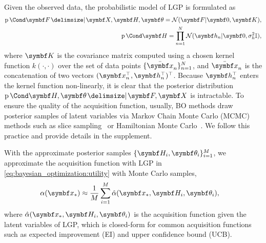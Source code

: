 Given the observed data, the probabilistic model of LGP is formulated as
\begin{align}
    \begin{split}
        \Prob{\mat{F} \given \mat{X}, \mat{H}, \mat{\theta}} = \mathcal{N}(\mat{F} | \mat{0}, \mat{K}),\\
        \Prob{\mat{H}} = \prod_{n=1}^N \mathcal{N}(\mat{h}_n | \mat{0}, \sigma_h^2\mathbb{I}),
    \end{split}
\end{align}
where $\mat{K}$ is the covariance matrix computed using a chosen kernel function $k(\cdot, \cdot)$ over the set of data points $\{\bar{\mat{x}}_n\}_{n=1}^N$, and $\bar{\mat{x}}_n$ is the concatenation of two vectors $(\mat{x}_n^\top, \mat{h}_n^\top)^\top$.
Because $\mat{h}_n^\top$ enters the kernel function non-linearly, it is clear that the posterior distribution $\Prob{\mat{H}, \mat{\theta} \given \mat{F}, \mat{X}}$ is intractable.
To ensure the quality of the acquisition function, usually, BO methods draw posterior samples of latent variables via Markov Chain Monte Carlo (MCMC) methods such as slice sampling~\parencite{snoek_practical_2012} or Hamiltonian Monte Carlo~\parencite{duane_hybrid_1987}.
We follow this practice and provide details in the supplement.

With the approximate posterior samples $\{\mat{H}_i, \mat{\theta}_i\}_{i=1}^M$, we approximate the acquisition function with LGP in \cref{eq:bayesian_optimization:utility} with Monte Carlo samples,
\begin{align}
    \alpha(\mat{x}_\ast) & \approx
    \frac{1}{M}\sum_{i=1}^M \hat{\alpha}(\mat{x}_*, \mat{H}_i, \mat{\theta}_i),
\end{align}
where $\hat{\alpha}(\mat{x}_*, \mat{H}_i, \mat{\theta}_i)$ is the acquisition function given the latent variables of LGP, which is closed-form for common acquisition functions such as expected improvement (EI) and upper confidence bound (UCB).

